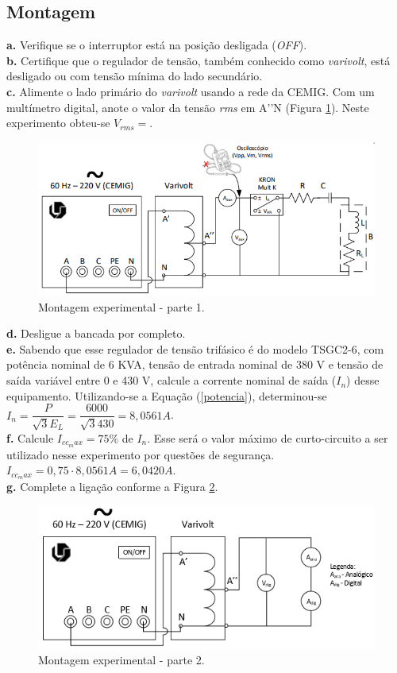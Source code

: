 \documentclass[a4paper,12pt,oneside,openany,table,xcdraw]{article}
\begin{document}
\subsection{Montagem} %
\noindent\textbf{a.} Verifique se o interruptor está na posição desligada (\textit{OFF}).\\
\textbf{b.} Certifique que o regulador de tensão, também conhecido como \textit{varivolt}, está desligado ou com tensão mínima do lado secundário.\\
\textbf{c.} Alimente o lado primário do \textit{varivolt} usando a rede da CEMIG. Com um multímetro digital, anote o valor da tensão \textit{rms} em A’’N (Figura \ref{fig1}). Neste experimento obteu-se $V_{rms}=$.\\
\begin{figure}[H]
\centering
\captionsetup{font=scriptsize}
\includegraphics[width=14.5cm]{fig1}
\caption{Montagem experimental - parte 1.}
\label{fig1}
\end{figure}
\noindent\textbf{d.} Desligue a bancada por completo.\\
\textbf{e.} Sabendo que esse regulador de tensão trifásico é do modelo TSGC2-6, com potência nominal de 6 KVA, tensão de entrada nominal de 380 V e tensão de saída variável entre 0 e 430 V, calcule a corrente nominal de saída ($I_n$) desse equipamento. Utilizando-se a Equação (\ref{potencia}), determinou-se $I_{n}=\dfrac{P}{\sqrt{3}E_L}=\dfrac{6000}{\sqrt{3}430}=8,0561A$.\\
\textbf{f.} Calcule $I_{cc_max} = 75\%$ de $I_n$. Esse será o valor máximo de curto-circuito a ser utilizado nesse experimento por questões de segurança. $I_{cc_max}=0,75\cdot 8,0561A=6,0420A$.\\
\textbf{g.} Complete a ligação conforme a Figura \ref{fig2}. \\
\begin{figure}[H]
\centering
\captionsetup{font=scriptsize}
\includegraphics[width=14.5cm]{fig2}
\caption{Montagem experimental - parte 2.}
\label{fig2}
\end{figure}
\end{document}
